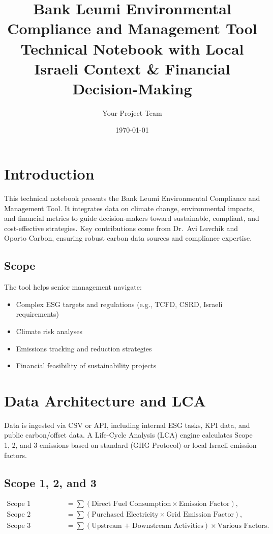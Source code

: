 \documentclass[12pt]{article}
\title{Bank Leumi Environmental Compliance and Management Tool \\
       \large{Technical Notebook with Local Israeli Context \& Financial Decision-Making}}
\author{Your Project Team}
\date{\today}
\begin{document}
\maketitle

\section{Introduction}
This technical notebook presents the Bank Leumi Environmental Compliance and Management Tool. 
It integrates data on climate change, environmental impacts, and financial metrics 
to guide decision-makers toward sustainable, compliant, and cost-effective strategies. 
Key contributions come from Dr.\ Avi Luvchik and Oporto Carbon, 
ensuring robust carbon data sources and compliance expertise.

\subsection{Scope}
The tool helps senior management navigate:
\begin{itemize}
    \item Complex ESG targets and regulations (e.g., TCFD, CSRD, Israeli requirements)
    \item Climate risk analyses
    \item Emissions tracking and reduction strategies
    \item Financial feasibility of sustainability projects
\end{itemize}

\section{Data Architecture and LCA}
Data is ingested via CSV or API, including internal ESG tasks, KPI data, and public carbon/offset data.
A Life-Cycle Analysis (LCA) engine calculates Scope 1, 2, and 3 emissions based on standard (GHG Protocol) 
or local Israeli emission factors.

\subsection{Scope 1, 2, and 3}
\begin{align*}
  \text{Scope 1 Emissions} &= \sum (\text{Direct Fuel Consumption} \times \text{Emission Factor}), \\
  \text{Scope 2 Emissions} &= \sum (\text{Purchased Electricity} \times \text{Grid Emission Factor}), \\
  \text{Scope 3 Emissions} &= \sum (\text{Upstream + Downstream Activities}) \times \text{Various Factors}.
\end{align*}
\end{document}
